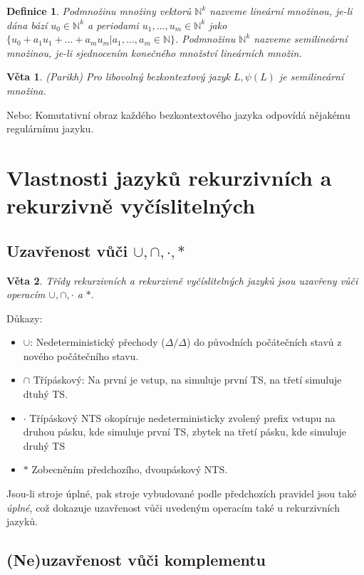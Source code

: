 \documentclass[a4paper, 11pt]{report}
\newtheorem{mydef}{Definice}[chapter]
\newtheorem{veta}{Věta}[chapter]
\begin{document}
\begin{mydef}
Podmnožinu množiny vektorů $\mathbb{N}^k$ nazveme \emph{lineární množinou}, je-li dána bází $u_0 \in \mathbb{N}^k$ a periodami $u_1, \dots, u_m \in \mathbb{N}^k$ jako $\{u_0 + a_1 u_1 + \dots + a_m u_m | a_1, \dots, a_m \in \mathbb{N}\}$. Podmnožinu $\mathbb{N}^k$ nazveme \emph{semilineární množinou}, je-li sjednocením konečného množství lineárních množin.
\end{mydef}

\begin{veta}
(Parikh) Pro libovolný bezkontextový jazyk $L, \psi(L)$ je semilineární množina.
\end{veta}
Nebo: Komutativní obraz každého bezkontextového jazyka odpovídá nějakému regulárnímu jazyku.

\section{Vlastnosti jazyků rekurzivních a rekurzivně vyčíslitelných}

\subsection{Uzavřenost vůči $\cup, \cap, \cdot, *$}

\begin{veta}
Třídy rekurzivních a rekurzivně vyčíslitelných jazyků jsou uzavřeny vůči operacím $\cup, \cap, \cdot$ a $*$.
\end{veta}
Důkazy:
\begin{itemize}
	\item $\cup$: Nedeterministický přechody ($\Delta/\Delta$) do původních počátečních stavů z nového počátečního stavu.
	\item $\cap$ Třípáskový: Na první je vstup, na simuluje první TS, na třetí simuluje dtuhý TS.
	\item $\cdot$ Třípáskový NTS okopíruje nedeterministicky zvolený prefix vstupu na druhou pásku, kde simuluje první TS, zbytek na třetí pásku, kde simuluje druhý TS
	\item $*$ Zobecněním předchozího, dvoupáskový NTS.
\end{itemize}
Jsou-li stroje úplné, pak stroje vybudované podle předchozích pravidel jsou také \emph{úplné}, což dokazuje uzavřenost vůči uvedeným operacím také u rekurzivních jazyků.

\subsection{(Ne)uzavřenost vůči komplementu}
\end{document}

